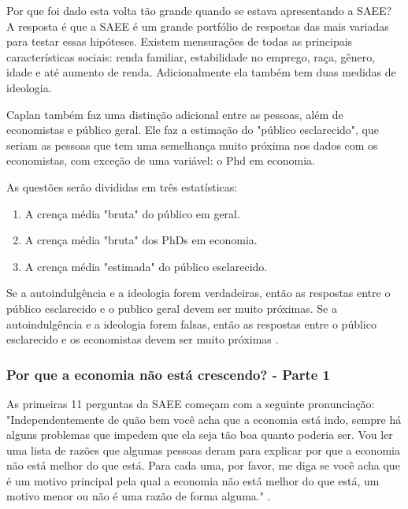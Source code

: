 Por que foi dado esta volta tão grande quando se estava apresentando a SAEE? A resposta é que a SAEE é um grande portfólio de respostas das mais variadas para testar essas hipóteses. Existem mensurações de todas as principais características sociais: renda familiar, estabilidade no emprego, raça, gênero, idade e até aumento de renda. Adicionalmente ela também tem duas medidas de ideologia.

Caplan também faz uma distinção adicional entre as pessoas, além de economistas e público geral. Ele faz a estimação do "público esclarecido", que seriam as pessoas que tem uma semelhança muito próxima nos dados com os economistas, com exceção de uma variável: o Phd em economia.

As questões serão divididas em três estatísticas:

\begin{enumerate}
    \item A crença média "bruta" do público em geral.
    \item A crença média "bruta" dos PhDs em economia.
    \item A crença média "estimada" do público esclarecido.
\end{enumerate}

Se a autoindulgência e a ideologia forem verdadeiras, então as respostas entre o público esclarecido e o publico geral devem ser muito próximas. Se a autoindulgência e a ideologia forem falsas, então as respostas entre o público esclarecido e os economistas devem ser muito próximas \cite{The_Myth_of_the_Rational_Voter}.

\subsubsection{Por que a economia não está crescendo? - Parte 1}

As primeiras 11 perguntas da SAEE começam com a seguinte pronunciação: "Independentemente de quão bem você acha que a economia está indo, sempre há alguns problemas que impedem que ela seja tão boa quanto poderia ser. Vou ler uma lista de razões que algumas pessoas deram para explicar por que a economia não está melhor do que está. Para cada uma, por favor, me diga se você acha que é um motivo principal pela qual a economia não está melhor do que está, um motivo menor ou não é uma razão de forma alguma." \cite{saee1996}.

